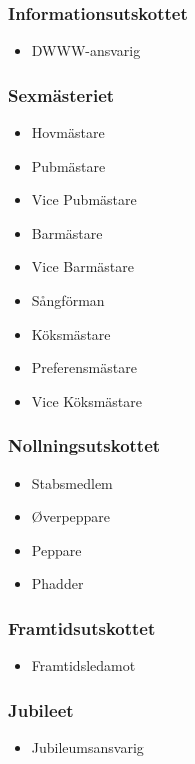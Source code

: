 \documentclass{dsekprotokoll}
\begin{document}
\begin{multicols}{2}
    \subsubsection*{Informationsutskottet}
    \begin{itemize}
        \item DWWW-ansvarig
    \end{itemize}

    \subsubsection*{Sexmästeriet}
    \begin{itemize}
        \item Hovmästare
        \item Pubmästare
        \item Vice Pubmästare
        \item Barmästare
        \item Vice Barmästare
        \item Sångförman
        \item Köksmästare
        \item Preferensmästare
        \item Vice Köksmästare
    \end{itemize}

    \subsubsection*{Nollningsutskottet}
    \begin{itemize}
        \item Stabsmedlem
        \item Øverpeppare
        \item Peppare
        \item Phadder
    \end{itemize}

    \subsubsection*{Framtidsutskottet}
    \begin{itemize}
        \item Framtidsledamot
    \end{itemize}

    \subsubsection*{Jubileet}
    \begin{itemize}
        \item Jubileumsansvarig
    \end{itemize}
\end{multicols}
\end{document}
